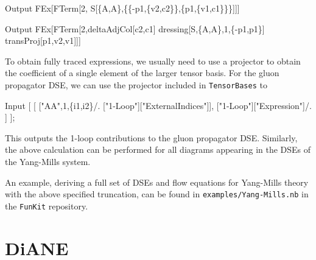 \documentclass[10pt,prd,nofootinbib,superscriptaddress,twocolumn]{revtex4-2}
\newcommand{\FunKit}{\texttt{FunKit}\xspace}
\newcommand{\TensorBases}{\texttt{TensorBases}\xspace}
\begin{document}
%
\begin{mmaCell}{Output}
 FEx[FTerm[2,
   S[\{A,A\},\{\{-p1,\{v2,c2\}\},\{p1,\{v1,c1\}\}\}]]]
\end{mmaCell}
%
\begin{mmaCell}{Output}
 FEx[FTerm[2,deltaAdjCol[c2,c1]
   dressing[S,\{A,A\},1,\{-p1,p1\}]
   transProj[p1,v2,v1]]]
\end{mmaCell}
%
To obtain fully traced expressions, we usually need to use a projector to obtain the coefficient of a single element of the larger tensor basis. For the gluon propagator DSE, we can use the projector included in \TensorBases to 
%
\begin{mmaCell}{Input}
 [
   [
     ["AA",1,\{i1,i2\}/.
       ["1-Loop"]["ExternalIndices"]], ["1-Loop"]["Expression"]/.
   ]
 ];
\end{mmaCell}
%
This outputs the 1-loop contributions to the gluon propagator DSE. Similarly, the above calculation can be performed for all diagrams appearing in the DSEs of the Yang-Mills system.

An example, deriving a full set of DSEs and flow equations for Yang-Mills theory with the above specified truncation, can be found in \texttt{examples/Yang-Mills.nb} in the \FunKit repository.

\clearpage
\section{D\MakeLowercase{i}ANE}
\label{sec:DiANE}
\end{document}
